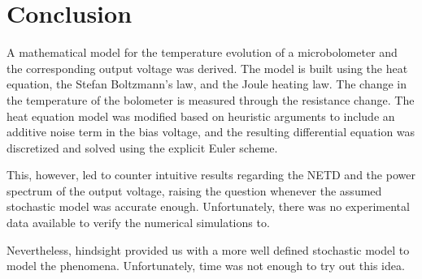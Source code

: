 \section{Conclusion}

A mathematical model for the temperature evolution of a microbolometer
and the corresponding output voltage was derived. The model is built
using the heat equation, the Stefan Boltzmann's law, and the Joule
heating law. The change in the temperature of the bolometer
is measured through the resistance change. The heat equation model was
modified based on heuristic arguments to include an additive noise
term in the bias voltage, and the resulting differential equation was
discretized and solved using the explicit Euler scheme.

This, however, led to counter intuitive results regarding the NETD and
the power spectrum of the output voltage, raising the question
whenever the assumed stochastic model was accurate
enough. Unfortunately, there was no experimental data available to
verify the numerical simulations to.

Nevertheless, hindsight provided us with a more well defined
stochastic model to model the phenomena. Unfortunately, time was not
enough to try out this idea.


